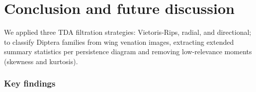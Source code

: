 \documentclass{birkjour}
\theoremstyle{definition}
\theoremstyle{remark}
\numberwithin{equation}{section}
\begin{document}
\section{Conclusion and future discussion}\quad

We applied three TDA filtration strategies: Vietoris-Rips, radial, and directional; to classify Diptera families from wing venation images, extracting extended summary statistics per persistence diagram and removing low-relevance moments (skewness and kurtosis).

\subsubsection{Key findings}\quad
\end{document}
